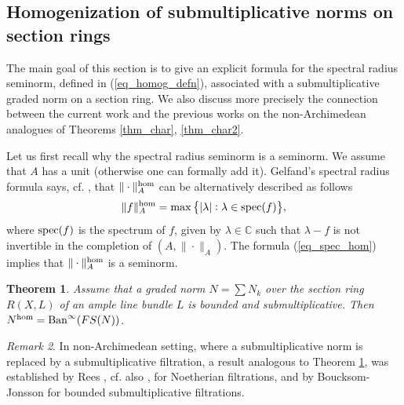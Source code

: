 \documentclass[12pt]{article}
\numberwithin{equation}{section}
\theoremstyle{theorem}
\newtheorem{thm}{Theorem}[section]
\theoremstyle{definition}
\theoremstyle{remark}
\newtheorem{rem}[thm]{Remark}
\newcommand{\comp}{\mathbb{C}}
\begin{document}
	\subsection{Homogenization of submultiplicative norms on section rings}\label{sect_homog}
	The main goal of this section is to give an explicit formula for the spectral radius seminorm, defined in (\ref{eq_homog_defn}), associated with a submultiplicative graded norm on a section ring.
	We also discuss more precisely the connection between the current work and the previous works on the non-Archimedean analogues of Theorems \ref{thm_char}, \ref{thm_char2}.
	\par 
	Let us first recall why the spectral radius seminorm is a seminorm. 
	We assume that $A$ has a unit (otherwise one can formally add it).
	Gelfand’s spectral radius formula says, cf. \cite[Theorems I.4.4, I.4.6]{GelfCommNormRing}, that $\| \cdot \|_A^{{\rm{hom}}}$ can be alternatively described as follows
	\begin{equation}\label{eq_spec_hom}
		\| f \|_A^{{\rm{hom}}} 
		=
		\max \big\{ 
			|\lambda| : \lambda \in {\rm{spec}}(f)
		\big\},
	\end{equation}
	where ${\rm{spec}}(f)$ is the spectrum of $f$, given by $\lambda \in \comp$ such that $\lambda - f$ is not invertible in the completion of  $(A, \| \cdot \|_A)$.
	The formula (\ref{eq_spec_hom}) implies that $\| \cdot \|_A^{{\rm{hom}}}$ is a seminorm.
	\begin{thm}\label{thm_hom}
		Assume that a graded norm $N = \sum N_k$ over the section ring $R(X, L)$ of an ample line bundle $L$ is bounded and submultiplicative. Then $
			N^{{\rm{hom}}} = {\rm{Ban}}^{\infty}(FS(N))$.
	\end{thm}
	\begin{rem}
		In non-Archimedean setting, where a submultiplicative norm is replaced by a submultiplicative filtration, a result analogous to Theorem \ref{thm_hom}, was established by Rees \cite[Corollary on p.168]{ReesValI}, cf. also \cite[\S 4.1]{ReesBook}, for Noetherian filtrations, and by Boucksom-Jonsson \cite[Theorem 2.16]{BouckJohn21} for bounded submultiplicative filtrations.
	\end{rem}
\end{document}
